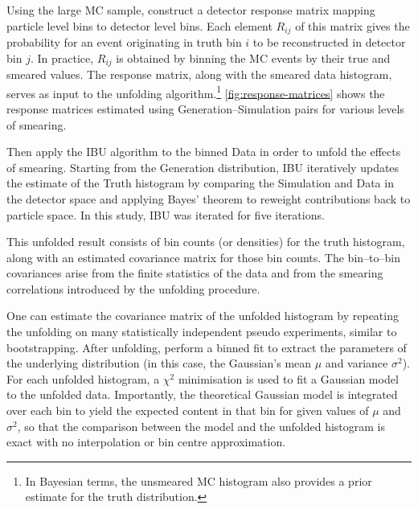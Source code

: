             Using the large MC sample, construct a detector response matrix mapping particle level bins to detector level bins.
            Each element $R_{ij}$ of this matrix gives the probability for an event originating in truth bin $i$ to be reconstructed in detector bin $j$.
            In practice, $R_{ij}$ is obtained by binning the MC events by their true and smeared values.
            The response matrix, along with the smeared data histogram, serves as input to the unfolding algorithm.\footnote{In Bayesian terms, the unsmeared MC histogram also provides a prior estimate for the truth distribution.}
            \cref{fig:response-matrices} shows the response matrices estimated using Generation--Simulation pairs for various levels of smearing.
    
            Then apply the IBU algorithm to the binned Data in order to unfold the effects of smearing.
            Starting from the Generation distribution, IBU iteratively updates the estimate of the Truth histogram by comparing the Simulation and Data in the detector space and applying Bayes' theorem to reweight contributions back to particle space. 
            In this study, IBU was iterated for five iterations.
            
            This unfolded result consists of bin counts (or densities) for the truth histogram, along with an estimated covariance matrix for those bin counts.
            The bin--to--bin covariances arise from the finite statistics of the data and from the smearing correlations introduced by the unfolding procedure.
            
            One can estimate the covariance matrix of the unfolded histogram by repeating the unfolding on many statistically independent pseudo experiments, similar to bootstrapping. 
            After unfolding, perform a binned fit to extract the parameters of the underlying distribution (in this case, the Gaussian’s mean $\mu$ and variance $\sigma^2$).
            For each unfolded histogram, a $\chi^2$ minimisation is used to fit a Gaussian model to the unfolded data.
            Importantly, the theoretical Gaussian model is integrated over each bin to yield the expected content in that bin for given values of $\mu$ and $\sigma^2$, so that the comparison between the model and the unfolded histogram is exact with no interpolation or bin centre approximation.
            
